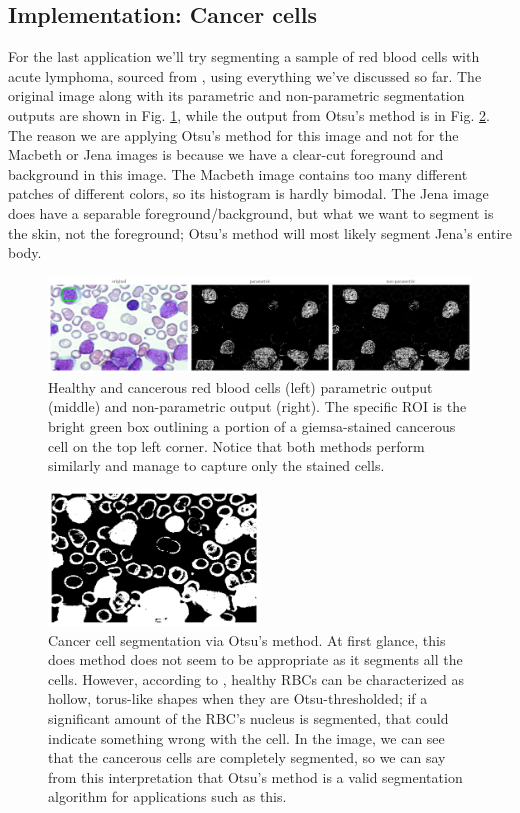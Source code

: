 \documentclass[12pt,a4paper]{article}
\begin{document}
\clearpage
\subsection*{Implementation: Cancer cells}
For the last application we'll try segmenting a sample of red blood cells with acute lymphoma, sourced from \cite{cancer}, using everything we've discussed so far. The original image along with its parametric and non-parametric segmentation outputs are shown in Fig. \ref{fig:cancer}, while the output from Otsu's method is in Fig. \ref{fig:cancer-otsu}. The reason we are applying Otsu's method for this image and not for the Macbeth or Jena images is because we have a clear-cut foreground and background in this image. The Macbeth image contains too many different patches of different colors, so its histogram is hardly bimodal. The Jena image does have a separable foreground/background, but what we want to segment is the skin, not the foreground; Otsu's method will most likely segment Jena's entire body.

\begin{figure}[htb]
	\centering
	\includegraphics[width=\textwidth]{cancer_giemsa.png}
	\caption{Healthy and cancerous red blood cells (left) parametric output (middle) and non-parametric output (right). The specific ROI is the bright green box outlining a portion of a giemsa-stained cancerous cell on the top left corner. Notice that both methods perform similarly and manage to capture only the stained cells.}
	\label{fig:cancer}
\end{figure}

\begin{figure}[htb]
	\centering
	\includegraphics[width=0.5\textwidth]{cancer_otsu.png}
	\caption{Cancer cell segmentation via Otsu's method. At first glance, this does method does not seem to be appropriate as it segments all the cells. However, according to \cite{malaria}, healthy RBCs can be characterized as hollow, torus-like shapes when they are Otsu-thresholded; if a significant amount of the RBC's nucleus is segmented, that could indicate something wrong with the cell. In the image, we can see that the cancerous cells are completely segmented, so we can say from this interpretation that Otsu's method is a valid segmentation algorithm for applications such as this.}
	\label{fig:cancer-otsu}
\end{figure}
\end{document}
